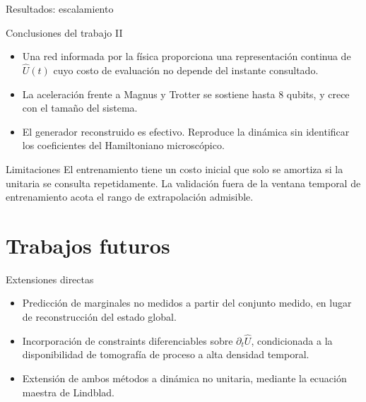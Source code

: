 \documentclass[10pt,aspectratio=169]{beamer}
\newcommand{\Uop}{\hat{U}}
\begin{document}
\begin{frame}{Resultados: escalamiento}
  \begin{center}
  \end{center}
\end{frame}

\begin{frame}{Conclusiones del trabajo II}
  \begin{itemize}
    \item Una red informada por la física proporciona una representación continua de $\Uop(t)$ cuyo costo de evaluación no depende del instante consultado.
    \pause
    \item La aceleración frente a Magnus y Trotter se sostiene hasta 8 qubits, y crece con el tamaño del sistema.
    \pause
    \item El generador reconstruido es efectivo. Reproduce la dinámica sin identificar los coeficientes del Hamiltoniano microscópico.
  \end{itemize}
  \vfill
  \pause
  \begin{block}{Limitaciones}
    El entrenamiento tiene un costo inicial que solo se amortiza si la unitaria se consulta repetidamente. La validación fuera de la ventana temporal de entrenamiento acota el rango de extrapolación admisible. %
  \end{block}
\end{frame}

\section{Trabajos futuros}

\begin{frame}{Extensiones directas}
  \begin{itemize}
    \item Predicción de marginales no medidos a partir del conjunto medido, en lugar de reconstrucción del estado global.
    \pause
    \item Incorporación de constraints diferenciables sobre $\partial_t \Uop$, condicionada a la disponibilidad de tomografía de proceso a alta densidad temporal.
    \pause
    \item Extensión de ambos métodos a dinámica no unitaria, mediante la ecuación maestra de Lindblad.
  \end{itemize}
\end{frame}
\end{document}
